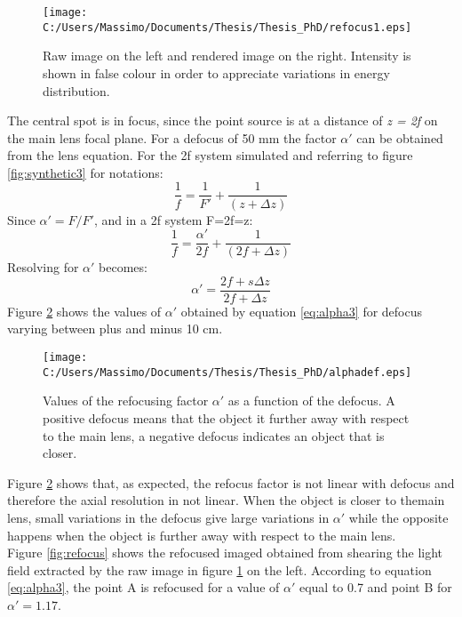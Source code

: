 \begin{figure}[H]
	\centering
	\texttt{[image: C:/Users/Massimo/Documents/Thesis/Thesis\_PhD/refocus1.eps]}
	\caption{\label{fig:rawandimage} Raw image on the left and rendered image on the right. Intensity is shown in false colour in order to appreciate variations in energy distribution. }
\end{figure}
The central spot is in focus, since the point source is at a distance of \textit{z = 2f} on the main lens focal plane.
For a defocus of 50 mm the factor $ \alpha'$ can be obtained from the lens equation. For the 2f system simulated and referring to figure \ref{fig:synthetic3} for notations:
\begin{equation}
\label{eq:alpha1}
\dfrac{1}{f} =\dfrac{1}{F'}+\dfrac{1}{(z+\Delta z)} 	
\end{equation}
Since $ \alpha' = F/F'$, and in a 2f system F=2f=z:
\begin{equation}
\label{eq:alpha2}
\dfrac{1}{f} =\dfrac{ \alpha'}{2f}+\dfrac{1}{(2f+\Delta z)} 	
\end{equation}
Resolving for $ \alpha'$ becomes:
\begin{equation}
\label{eq:alpha3}
 \alpha' = \dfrac{2f+s\Delta z}{2f+\Delta z} 	
\end{equation}
Figure \ref{fig:alpha} shows the values of $ \alpha'$ obtained by equation \ref{eq:alpha3} for defocus varying between plus and minus 10 cm.
\begin{figure}[H]
	\centering
	\texttt{[image: C:/Users/Massimo/Documents/Thesis/Thesis\_PhD/alphadef.eps]}
	\caption{\label{fig:alpha} Values of the refocusing factor $ \alpha'$ as a function of the defocus. A positive defocus means that the object it further away with respect to the main lens, a negative defocus indicates an object that is closer. }
\end{figure}
Figure \ref{fig:alpha} shows that, as expected, the refocus factor is not linear with defocus and therefore the axial resolution in not linear. When the object is closer to themain lens, small variations in the defocus give large variations in $ \alpha'$ while the opposite happens when the object is further away with respect to the main lens. \\
Figure \ref{fig:refocus} shows the refocused imaged obtained from shearing the light field extracted by the raw image in figure \ref{fig:rawandimage} on the left. According to equation \ref{eq:alpha3}, the point A is refocused for a value of $ \alpha'$ equal to 0.7 and point B for $ \alpha' = 1.17$.
